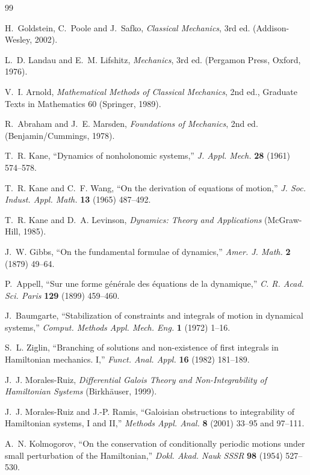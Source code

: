 \documentclass[11pt,a4paper]{book}
\theoremstyle{definition}
\theoremstyle{remark}
\begin{document}
\begin{thebibliography}{99}

 H.~Goldstein, C.~Poole and J.~Safko, \emph{Classical Mechanics}, 3rd ed.
(Addison-Wesley, 2002).

 L.~D. Landau and E.~M. Lifshitz, \emph{Mechanics}, 3rd ed. (Pergamon Press, Oxford, 1976).

 V.~I. Arnold, \emph{Mathematical Methods of Classical Mechanics}, 2nd ed., Graduate Texts in
Mathematics 60 (Springer, 1989).

 R.~Abraham and J.~E. Marsden, \emph{Foundations of Mechanics}, 2nd ed.
(Benjamin/Cummings, 1978).

 T.~R. Kane, ``Dynamics of nonholonomic systems,'' \emph{J. Appl. Mech.} \textbf{28} (1961) 574--578.

 T.~R. Kane and C.~F. Wang, ``On the derivation of equations of motion,''
\emph{J. Soc. Indust. Appl. Math.} \textbf{13} (1965) 487--492.

 T.~R. Kane and D.~A. Levinson, \emph{Dynamics: Theory and Applications}
(McGraw-Hill, 1985).

 J.~W. Gibbs, ``On the fundamental formulae of dynamics,'' \emph{Amer. J. Math.} \textbf{2} (1879) 49--64.

 P.~Appell, ``Sur une forme g\'en\'erale des \'equations de la dynamique,''
\emph{C. R. Acad. Sci. Paris} \textbf{129} (1899) 459--460.

 J.~Baumgarte, ``Stabilization of constraints and integrals of motion in dynamical systems,''
\emph{Comput. Methods Appl. Mech. Eng.} \textbf{1} (1972) 1--16.

 S.~L. Ziglin, ``Branching of solutions and non-existence of first integrals in Hamiltonian mechanics. I,''
\emph{Funct. Anal. Appl.} \textbf{16} (1982) 181--189.

 J.~J. Morales-Ruiz, \emph{Differential Galois Theory and Non-Integrability of Hamiltonian
Systems} (Birkh\"auser, 1999).

 J.~J. Morales-Ruiz and J.-P. Ramis, ``Galoisian obstructions to integrability of Hamiltonian systems,
I and II,'' \emph{Methods Appl. Anal.} \textbf{8} (2001) 33--95 and 97--111.

 A.~N. Kolmogorov, ``On the conservation of conditionally periodic motions under small perturbation
of the Hamiltonian,'' \emph{Dokl. Akad. Nauk SSSR} \textbf{98} (1954) 527--530.


\end{thebibliography}
\end{document}
